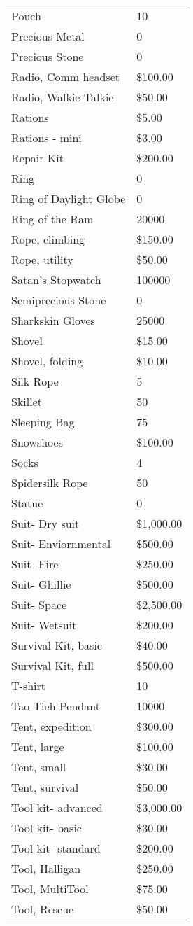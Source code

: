 \documentclass[twoside]{book}
\begin{document}
\begin{longtable}{p{1.25in}l}
      \raggedright Pouch & 10 \tabularnewline
      \raggedright Precious Metal & 0 \tabularnewline
      \raggedright Precious Stone & 0 \tabularnewline
      \raggedright Radio, Comm headset & \$100.00 \tabularnewline
      \raggedright Radio, Walkie-Talkie & \$50.00 \tabularnewline
      \raggedright Rations & \$5.00 \tabularnewline
      \raggedright Rations - mini & \$3.00 \tabularnewline
      \raggedright Repair Kit & \$200.00 \tabularnewline
      \raggedright Ring & 0 \tabularnewline
      \raggedright Ring of Daylight Globe & 0 \tabularnewline
      \raggedright Ring of the Ram & 20000 \tabularnewline
      \raggedright Rope, climbing & \$150.00 \tabularnewline
      \raggedright Rope, utility & \$50.00 \tabularnewline
      \raggedright Satan's Stopwatch & 100000 \tabularnewline
      \raggedright Semiprecious Stone & 0 \tabularnewline
      \raggedright Sharkskin Gloves & 25000 \tabularnewline
      \raggedright Shovel & \$15.00 \tabularnewline
      \raggedright Shovel, folding & \$10.00 \tabularnewline
      \raggedright Silk Rope & 5 \tabularnewline
      \raggedright Skillet & 50 \tabularnewline
      \raggedright Sleeping Bag & 75 \tabularnewline
      \raggedright Snowshoes & \$100.00 \tabularnewline
      \raggedright Socks & 4 \tabularnewline
      \raggedright Spidersilk Rope & 50 \tabularnewline
      \raggedright Statue & 0 \tabularnewline
      \raggedright Suit- Dry suit & \$1,000.00 \tabularnewline
      \raggedright Suit- Enviornmental & \$500.00 \tabularnewline
      \raggedright Suit- Fire & \$250.00 \tabularnewline
      \raggedright Suit- Ghillie & \$500.00 \tabularnewline
      \raggedright Suit- Space & \$2,500.00 \tabularnewline
      \raggedright Suit- Wetsuit & \$200.00 \tabularnewline
      \raggedright Survival Kit, basic & \$40.00 \tabularnewline
      \raggedright Survival Kit, full & \$500.00 \tabularnewline
      \raggedright T-shirt & 10 \tabularnewline
      \raggedright Tao Tieh Pendant & 10000 \tabularnewline
      \raggedright Tent, expedition & \$300.00 \tabularnewline
      \raggedright Tent, large & \$100.00 \tabularnewline
      \raggedright Tent, small & \$30.00 \tabularnewline
      \raggedright Tent, survival & \$50.00 \tabularnewline
      \raggedright Tool kit- advanced & \$3,000.00 \tabularnewline
      \raggedright Tool kit- basic & \$30.00 \tabularnewline
      \raggedright Tool kit- standard & \$200.00 \tabularnewline
      \raggedright Tool, Halligan & \$250.00 \tabularnewline
      \raggedright Tool, MultiTool & \$75.00 \tabularnewline
      \raggedright Tool, Rescue & \$50.00 \tabularnewline

\end{longtable}
\end{document}

